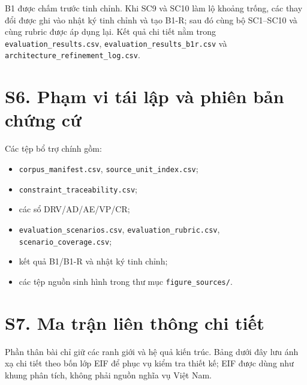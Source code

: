 \documentclass[a4paper,11pt]{article}
\begin{document}
B1 được chấm trước tinh chỉnh. Khi SC9 và SC10 làm lộ khoảng trống, các thay đổi được ghi vào nhật ký tinh chỉnh và tạo B1-R; sau đó cùng bộ SC1--SC10 và cùng rubric được áp dụng lại. Kết quả chi tiết nằm trong \texttt{evaluation\_results.csv}, \texttt{evaluation\_results\_b1r.csv} và \texttt{architecture\_refinement\_log.csv}.

\section*{S6. Phạm vi tái lập và phiên bản chứng cứ}
Các tệp bổ trợ chính gồm:
\begin{itemize}
\item \texttt{corpus\_manifest.csv}, \texttt{source\_unit\_index.csv};
\item \texttt{constraint\_traceability.csv};
\item các sổ DRV/AD/AE/VP/CR;
\item \texttt{evaluation\_scenarios.csv}, \texttt{evaluation\_rubric.csv}, \texttt{scenario\_coverage.csv};
\item kết quả B1/B1-R và nhật ký tinh chỉnh;
\item các tệp nguồn sinh hình trong thư mục \texttt{figure\_sources/}.
\end{itemize}



\section*{S7. Ma trận liên thông chi tiết}
Phần thân bài chỉ giữ các ranh giới và hệ quả kiến trúc. Bảng dưới đây lưu ánh xạ chi tiết theo bốn lớp EIF để phục vụ kiểm tra thiết kế; EIF được dùng như khung phân tích, không phải nguồn nghĩa vụ Việt Nam.
\end{document}
